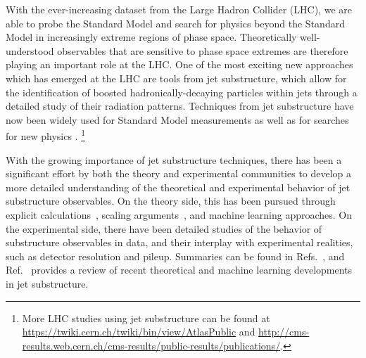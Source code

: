 With the ever-increasing dataset from the Large Hadron Collider (LHC), we are able to probe the Standard Model and search for physics beyond the Standard Model in increasingly extreme regions of phase space.
%
Theoretically well-understood observables that are sensitive to phase space extremes are therefore playing an important role at the LHC.
%
One of the most exciting new approaches which has emerged at the LHC are tools from jet substructure, which allow for the identification of boosted hadronically-decaying particles within jets through a detailed study of their radiation patterns.
%
Techniques from jet substructure have now been widely used for Standard Model measurements \cite{Chatrchyan:2012sn,CMS:2013cda,Aad:2015cua,Aad:2015lxa,ATLAS-CONF-2015-035,Aad:2015rpa,Aad:2015hna,ATLAS-CONF-2016-002,ATLAS-CONF-2016-039,ATLAS-CONF-2016-034,CMS-PAS-TOP-16-013,CMS-PAS-HIG-16-004} as well as for searches for new physics  \cite{CMS:2011bqa,Fleischmann:2013woa,Pilot:2013bla,TheATLAScollaboration:2013qia,Chatrchyan:2012ku,CMS-PAS-B2G-14-001,CMS-PAS-B2G-14-002,Khachatryan:2015axa,Khachatryan:2015bma,Aad:2015owa,Aaboud:2016okv,Aaboud:2016trl,Aaboud:2016qgg,ATLAS-CONF-2016-055,ATLAS-CONF-2015-071,ATLAS-CONF-2015-068,CMS-PAS-EXO-16-037,CMS-PAS-EXO-16-040,Khachatryan:2016mdm,CMS-PAS-HIG-16-016,CMS-PAS-B2G-15-003,CMS-PAS-EXO-16-017}.%
\footnote{More LHC studies using jet substructure can be found at \url{https://twiki.cern.ch/twiki/bin/view/AtlasPublic} and \url{http://cms-results.web.cern.ch/cms-results/public-results/publications/}.} 

With the growing importance of jet substructure techniques, there has been a significant effort by both the theory and experimental communities to develop a more detailed understanding of the theoretical and experimental behavior of jet substructure observables.
%
On the theory side, this has been pursued through explicit calculations~\cite{Feige:2012vc,Field:2012rw,Dasgupta:2013ihk,Dasgupta:2013via,Larkoski:2014pca,Dasgupta:2015yua,Seymour:1997kj,Li:2011hy,Larkoski:2012eh,Jankowiak:2012na,Chien:2014nsa,Chien:2014zna,Isaacson:2015fra,Krohn:2012fg,Waalewijn:2012sv,Larkoski:2014tva,Procura:2014cba,Bertolini:2015pka,Bhattacherjee:2015psa,Larkoski:2015kga,Dasgupta:2015lxh,Frye:2016okc,Frye:2016aiz,Kang:2016ehg,Hornig:2016ahz,Marzani:2017mva,Marzani:2017kqd,Hoang:2017kmk,Larkoski:2017iuy,Larkoski:2017cqq}, scaling arguments~\cite{Walsh:2011fz,Larkoski:2014gra,Larkoski:2014zma}, and machine learning \cite{Cogan:2014oua,deOliveira:2015xxd,Almeida:2015jua,Baldi:2016fql,Guest:2016iqz,Conway:2016caq,Barnard:2016qma} approaches.
%
On the experimental side, there have been detailed studies of the behavior of substructure observables in data, and their interplay with experimental realities, such as detector resolution and pileup.
%
Summaries can be found in Refs.~\cite{Abdesselam:2010pt,Altheimer:2012mn,Altheimer:2013yza,Adams:2015hiv}, and Ref.~\cite{Larkoski:2017jix} provides a review of recent theoretical and machine learning developments in jet substructure. 


